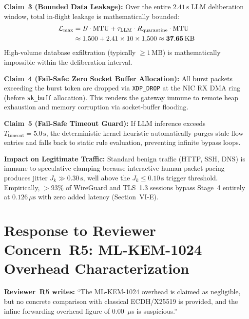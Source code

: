 \documentclass[10pt,letterpaper]{article}
\begin{document}
\begin{authorbox}
\textbf{Claim~3 (Bounded Data Leakage):}
Over the entire $2.41\,\mathrm{s}$ LLM deliberation window, total in-flight
leakage is mathematically bounded:
\begin{align}
  \mathcal{L}_{\mathrm{max}} &= B \cdot \mathrm{MTU} + \tau_{\mathrm{LLM}} \cdot R_{\mathrm{quarantine}} \cdot \mathrm{MTU} \notag \\
  &\approx 1{,}500 + 2.41 \times 10 \times 1{,}500 \approx \mathbf{37.65\,\mathrm{KB}}
\end{align}
High-volume database exfiltration (typically $\ge 1\,\mathrm{MB}$) is
mathematically impossible within the deliberation interval.

\textbf{Claim~4 (Fail-Safe: Zero Socket Buffer Allocation):}
All burst packets exceeding the burst token are dropped via
\texttt{XDP\_DROP} at the NIC RX DMA ring (before \texttt{sk\_buff}
allocation). This renders the gateway immune to remote heap exhaustion and
memory corruption via socket-buffer flooding.

\textbf{Claim~5 (Fail-Safe Timeout Guard):}
If LLM inference exceeds $T_{\mathrm{timeout}} = 5.0\,\mathrm{s}$, the
deterministic kernel heuristic automatically purges stale flow entries and
falls back to static rule evaluation, preventing infinite bypass loops.

\textbf{Impact on Legitimate Traffic:}
Standard benign traffic (HTTP, SSH, DNS) is immune to speculative clamping
because interactive human packet pacing produces jitter $J_k \gg 0.30\,\mathrm{s}$,
well above the $J_k \le 0.10\,\mathrm{s}$ trigger threshold. Empirically,
$> 93\%$ of WireGuard and TLS~1.3 sessions bypass Stage~4 entirely at
$0.126\,\mu\mathrm{s}$ with zero added latency (Section~VI-E).
\end{authorbox}

\section{Response to Reviewer Concern~R5: ML-KEM-1024 Overhead Characterization}

\begin{reviewerbox}
\textbf{Reviewer~R5 writes:} ``The ML-KEM-1024 overhead is claimed as
negligible, but no concrete comparison with classical ECDH/X25519 is provided,
and the inline forwarding overhead figure of 0.00~$\mu$s is suspicious.''
\end{reviewerbox}
\end{document}
